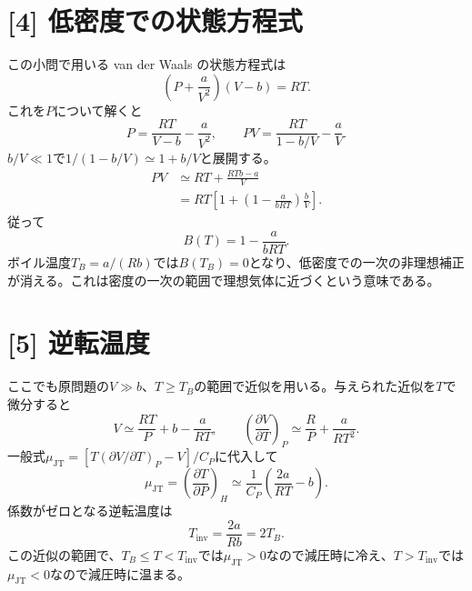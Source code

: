 \documentclass[11pt,a4paper]{article}
\begin{document}
\section*{[4] 低密度での状態方程式}
この小問で用いる van der Waals の状態方程式は
\begin{equation}
  \left(P+\frac{a}{V^2}\right)(V-b)=RT.
\end{equation}
これを$P$について解くと
\begin{equation}
  P=\frac{RT}{V-b}-\frac{a}{V^2},
  \qquad
  PV=\frac{RT}{1-b/V}-\frac{a}{V}.
\end{equation}
$b/V\ll1$で$1/(1-b/V)\simeq1+b/V$と展開する。
\begin{align}
  PV&\simeq RT+\frac{RTb-a}{V}\\
    &=RT\left[1+\left(1-\frac{a}{bRT}\right)\frac bV\right].
\end{align}
従って
\begin{equation}
  \boxed{B(T)=1-\frac{a}{bRT}}.
\end{equation}
ボイル温度$T_B=a/(Rb)$では$B(T_B)=0$となり、低密度での一次の非理想補正が消える。これは密度の一次の範囲で理想気体に近づくという意味である。

\section*{[5] 逆転温度}
ここでも原問題の$V\gg b$、$T\ge T_B$の範囲で近似を用いる。与えられた近似を$T$で微分すると
\begin{equation}
  V\simeq\frac{RT}{P}+b-\frac{a}{RT},
  \qquad
  \left(\frac{\partial V}{\partial T}\right)_P
  \simeq\frac RP+\frac{a}{RT^2}.
\end{equation}
一般式$\mu_{\mathrm{JT}}=[T(\partial V/\partial T)_P-V]/C_P$に代入して
\begin{equation}
  \boxed{\mu_{\mathrm{JT}}
  =\left(\frac{\partial T}{\partial P}\right)_H
  \simeq\frac1{C_P}\left(\frac{2a}{RT}-b\right)}.
\end{equation}
係数がゼロとなる逆転温度は
\begin{equation}
  \boxed{T_{\mathrm{inv}}=\frac{2a}{Rb}=2T_B}.
\end{equation}
この近似の範囲で、$T_B\le T<T_{\mathrm{inv}}$では$\mu_{\mathrm{JT}}>0$なので減圧時に冷え、$T>T_{\mathrm{inv}}$では$\mu_{\mathrm{JT}}<0$なので減圧時に温まる。
\end{document}
